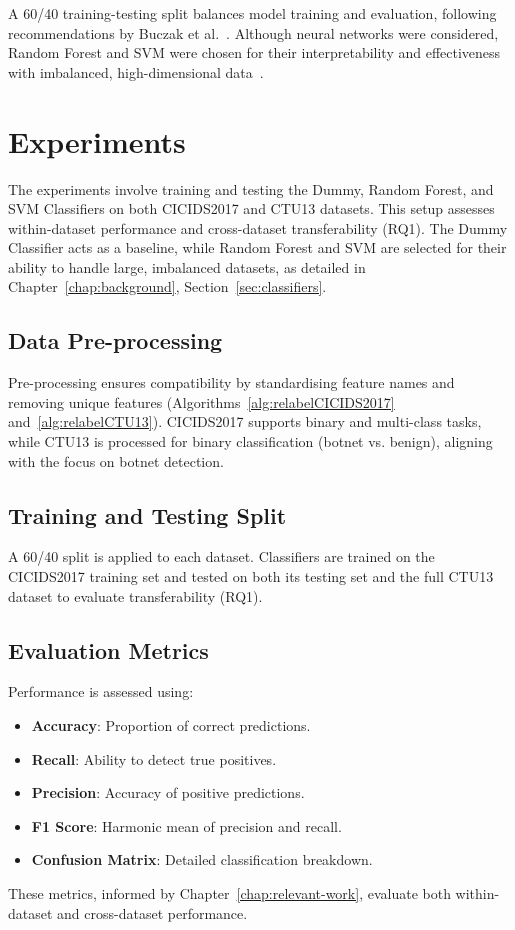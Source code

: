 A 60/40 training-testing split balances model training and evaluation, following recommendations by Buczak et al.~\cite{buczak2015survey}. Although neural networks were considered, Random Forest and SVM were chosen for their interpretability and effectiveness with imbalanced, high-dimensional data~\cite{farnaaz2016random, teng2017svm}.

\section{Experiments}\label{sec:Experiments}

The experiments involve training and testing the Dummy, Random Forest, and SVM Classifiers on both CICIDS2017 and CTU13 datasets. This setup assesses within-dataset performance and cross-dataset transferability (RQ1). The Dummy Classifier acts as a baseline, while Random Forest and SVM are selected for their ability to handle large, imbalanced datasets, as detailed in Chapter~\ref{chap:background}, Section~\ref{sec:classifiers}.

\subsection{Data Pre-processing}\label{subsec:DataPreprocessing}

Pre-processing ensures compatibility by standardising feature names and removing unique features (Algorithms~\ref{alg:relabelCICIDS2017} and~\ref{alg:relabelCTU13}). CICIDS2017 supports binary and multi-class tasks, while CTU13 is processed for binary classification (botnet vs. benign), aligning with the focus on botnet detection.

\subsection{Training and Testing Split}\label{subsec:TrainingTestingSplit}

A 60/40 split is applied to each dataset. Classifiers are trained on the CICIDS2017 training set and tested on both its testing set and the full CTU13 dataset to evaluate transferability (RQ1).

\subsection{Evaluation Metrics}\label{subsec:EvaluationMetrics}

Performance is assessed using:
\begin{itemize}
    \item \textbf{Accuracy}: Proportion of correct predictions.
    \item \textbf{Recall}: Ability to detect true positives.
    \item \textbf{Precision}: Accuracy of positive predictions.
    \item \textbf{F1 Score}: Harmonic mean of precision and recall.
    \item \textbf{Confusion Matrix}: Detailed classification breakdown.
\end{itemize}
These metrics, informed by Chapter~\ref{chap:relevant-work}, evaluate both within-dataset and cross-dataset performance.

